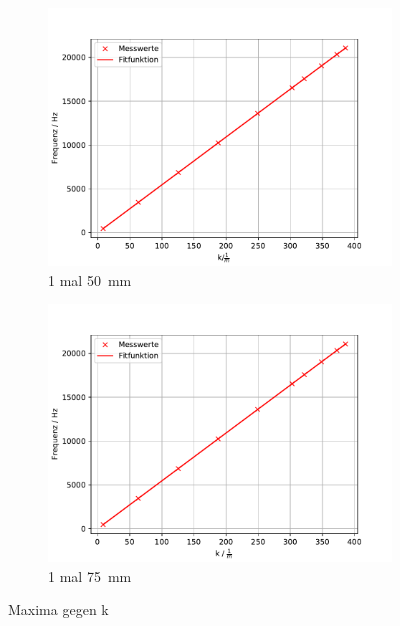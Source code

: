 \begin{figure}
 \centering
 \begin{subfigure}{0.48\textwidth}
  \centering
  \includegraphics[width=1\textwidth]{A6.pdf}
  \caption{1 mal \SI{50}{mm}}
  \label{fig.Aufgabe6}
 \end{subfigure}
 \begin{subfigure}{0.48\textwidth}
  \centering
  \includegraphics[width=1\textwidth]{A7.pdf}
  \caption{1 mal \SI{75}{mm}}
  \label{fig.Aufgabe7}
 \end{subfigure}
 \caption{Maxima gegen k}
\end{figure}
\FloatBarrier

